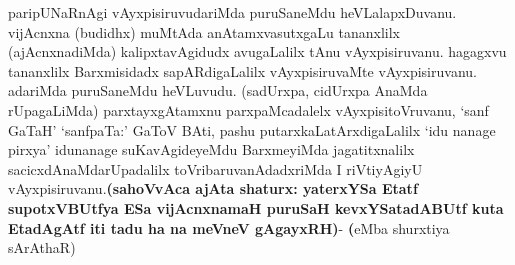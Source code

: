 \begin{artha}
paripUNaRnAgi vAyxpisiruvudariMda puruSaneMdu
heVLalapxDuvanu. vijAcnxna (budidhx) muMtAda anAtamxvasutxgaLu
tananxlilx (ajAcnxnadiMda) kalipxtavAgidudx avugaLalilx tAnu
vAyxpisiruvanu. hagagxvu tananxlilx Barxmisidadx sapARdigaLalilx
vAyxpisiruvaMte vAyxpisiruvanu. adariMda puruSaneMdu heVLuvudu.
(sadUrxpa, cidUrxpa AnaMda rUpagaLiMda) parxtayxgAtamxnu
parxpaMcadalelx vAyxpisitoVruvanu, `sanf GaTaH' `sanfpaTa:' GaToV BAti,
pashu putarxkaLatArxdigaLalilx `idu nanage pirxya' idunanage
suKavAgideyeMdu BarxmeyiMda jagatitxnalilx sacicxdAnaMdarUpadalilx
toVribaruvanAdadxriMda I riVtiyAgiyU vAyxpisiruvanu.\textbf{(sahoVvAca ajAta
shaturx: yaterxYSa Etatf supotxV\s BUtfya ESa vijAcnxnamaH puruSaH
kevxYSatadA\s BUtf kuta EtadAgAtf iti tadu ha na meVneV gAgayxRH)}-
\textbf(eMba shurxtiya sArAthaR)
\end{artha}

